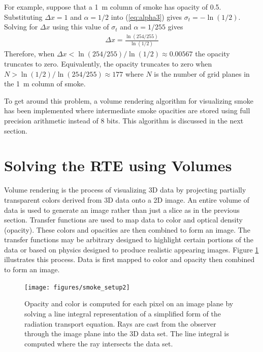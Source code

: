 For example, suppose that a 1~m column of smoke has opacity of 0.5.  Substituting $\Delta x=1$ and $\alpha=1/2$ into (\ref{eq:alpha3}) gives $\sigma_t=-\ln(1/2)$.  Solving for $\Delta x$ using this value of $\sigma_t$ and $\alpha=1/255$ gives
\begin{eqnarray*}
\Delta x = \frac{\ln(254/255)}{\ln(1/2)}
\end{eqnarray*}
Therefore, when $\Delta x<\ln(254/255)/\ln(1/2)\approx 0.00567$ the opacity truncates to zero.  Equivalently, the opacity truncates to zero when $N>\ln(1/2)/\ln(254/255)\approx 177$ where $N$ is the number of grid planes in the 1~m column of smoke.

To get around this problem, a volume rendering algorithm for visualizing smoke has been implemented where intermediate smoke opacities are stored using full precision arithmetic instead of 8 bits.  This algorithm is discussed in the next section.


%
%

\section{Solving the RTE using Volumes}
Volume rendering is the process of visualizing 3D data by projecting partially transparent colors derived from 3D data onto a 2D image.  An entire volume of data is used to generate an image rather than just a slice as in the previous section.  Transfer functions are used to map data to color and optical density (opacity).  These colors and opacities are then combined to form an image.  The transfer functions may be arbitrary designed to highlight certain portions of the data or based on physics designed to produce realistic appearing images.  Figure \ref{figsmokesetup2} illustrates this process.  Data is first mapped to color and opacity then combined to form an image.
\begin{figure}[\figoptions]
\begin{center}
\texttt{[image: figures/smoke\_setup2]}
\end{center}
\caption[Opacity and color is computed for each pixel on an image plane by solving a line integral
representation of a simplified form of the radiation transport equation.]{Opacity and color is computed for each pixel on an image plane by solving a line integral
representation of a simplified form of the radiation transport equation.  Rays are cast from the observer through the  image plane into the 3D data set.  The line integral is computed where the ray intersects the data set.
}
\label{figsmokesetup2}
\end{figure}

